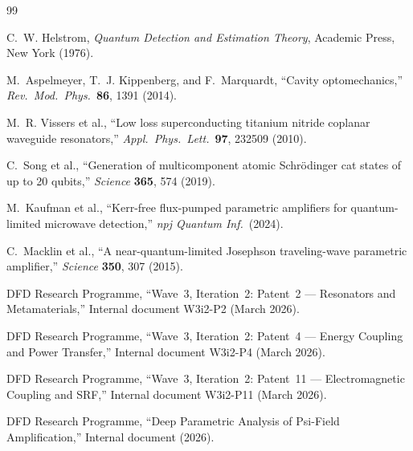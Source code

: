 \documentclass[11pt,twocolumn]{article}
\theoremstyle{definition}
\theoremstyle{remark}
\begin{document}
\begin{thebibliography}{99}

C.~W. Helstrom,
\textit{Quantum Detection and Estimation Theory},
Academic Press, New York (1976).

M.~Aspelmeyer, T.~J. Kippenberg, and F.~Marquardt,
``Cavity optomechanics,''
\textit{Rev.\ Mod.\ Phys.}\ \textbf{86}, 1391 (2014).

M.~R. Vissers et al.,
``Low loss superconducting titanium nitride coplanar waveguide
resonators,''
\textit{Appl.\ Phys.\ Lett.}\ \textbf{97}, 232509 (2010).

C.~Song et al.,
``Generation of multicomponent atomic Schr\"odinger cat states of up
to 20 qubits,''
\textit{Science} \textbf{365}, 574 (2019).

M.~Kaufman et al.,
``Kerr-free flux-pumped parametric amplifiers for quantum-limited
microwave detection,''
\textit{npj Quantum Inf.}\ (2024).

C.~Macklin et al.,
``A near-quantum-limited Josephson traveling-wave parametric amplifier,''
\textit{Science} \textbf{350}, 307 (2015).

DFD Research Programme,
``Wave~3, Iteration~2: Patent~2 --- Resonators and Metamaterials,''
Internal document W3i2-P2 (March 2026).

DFD Research Programme,
``Wave~3, Iteration~2: Patent~4 --- Energy Coupling and Power Transfer,''
Internal document W3i2-P4 (March 2026).

DFD Research Programme,
``Wave~3, Iteration~2: Patent~11 --- Electromagnetic Coupling and SRF,''
Internal document W3i2-P11 (March 2026).

DFD Research Programme,
``Deep Parametric Analysis of Psi-Field Amplification,''
Internal document (2026).

\end{thebibliography}
\end{document}

